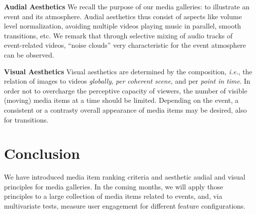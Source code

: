 \documentclass{article}
\begin{document}
\noindent \textbf{Audial Aesthetics}
We recall the purpose of our media galleries:
to illustrate an event and its atmosphere.
Audial aesthetics thus consist of aspects like volume level normalization,
avoiding multiple videos playing music in parallel, smooth transitions, etc.
We remark that through selective mixing of audio tracks
of event-related videos, ``noise clouds'' very characteristic
for the event atmosphere can be observed.

\noindent \textbf{Visual Aesthetics}
Visual aesthetics are determined by the composition, \emph{i.e.},
the relation of images to videos \emph{globally}, \emph{per coherent scene},
and per \emph{point in time}.
In order not to overcharge the perceptive capacity
of viewers, the number of visible (moving) media items
at a time should be limited.
Depending on the event, a consistent or a contrasty overall
appearance of media items may be desired, also for transitions.

\section{Conclusion}
We have introduced media item ranking criteria and
aesthetic audial and visual principles for media galleries.
In the coming months, we will apply those principles
to a large collection of media items related to events,
and, via multivariate tests, measure user engagement
for different feature configurations.




\end{document}
